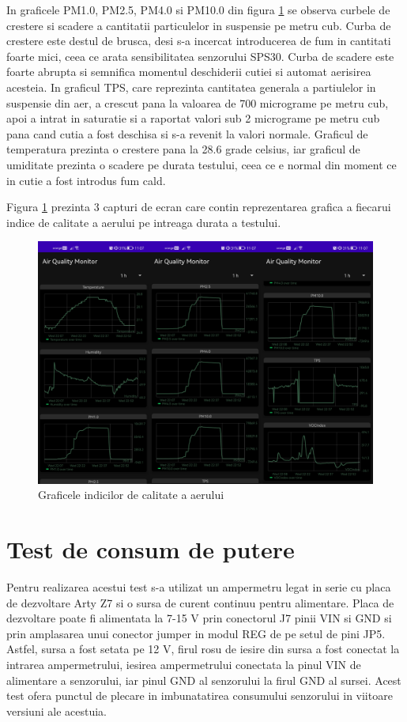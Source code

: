 In graficele PM1.0, PM2.5, PM4.0 si PM10.0 din figura \ref{fig:tv_pm_var_chart_view} se observa curbele de crestere si scadere a cantitatii particulelor in suspensie 
pe metru cub. Curba de crestere este destul de brusca, desi s-a incercat introducerea de fum in cantitati foarte mici, ceea ce arata sensibilitatea senzorului SPS30. 
Curba de scadere este foarte abrupta si semnifica momentul deschiderii cutiei si automat aerisirea acesteia. In graficul TPS, care reprezinta cantitatea generala a 
partiulelor in suspensie din aer, a crescut pana la valoarea de 700 micrograme pe metru cub, apoi a intrat in saturatie si a raportat valori sub 2 micrograme pe metru 
cub pana cand cutia a fost deschisa si s-a revenit la valori normale. Graficul de temperatura prezinta o crestere pana la 28.6 grade celsius, iar graficul de umiditate 
prezinta o scadere pe durata testului, ceea ce e normal din moment ce in cutie a fost introdus fum cald.    

Figura \ref{fig:tv_pm_var_chart_view} prezinta 3 capturi de ecran care contin reprezentarea grafica a fiecarui indice de calitate a aerului pe 
intreaga durata a testului.
\begin{figure}[H]
    \centering
    \includegraphics[scale=0.16]{figs/tv_pm_var_chart_view.png}
    \caption{Graficele indicilor de calitate a aerului}
    \label{fig:tv_pm_var_chart_view}
\end{figure}

\section{Test de consum de putere}\label{sec:tv_pwrcons}
Pentru realizarea acestui test s-a utilizat un ampermetru legat in serie cu placa de dezvoltare Arty Z7 si o sursa de curent continuu pentru alimentare. Placa de dezvoltare 
poate fi alimentata la 7-15 V prin conectorul J7 pinii VIN si GND si prin amplasarea unui conector jumper in modul REG de pe setul de pini JP5. Astfel, sursa a fost setata 
pe 12 V, firul rosu de iesire din sursa a fost conectat la intrarea ampermetrului, iesirea ampermetrului conectata la pinul VIN de alimentare a senzorului, iar pinul GND 
al senzorului la firul GND al sursei. Acest test ofera punctul de plecare in imbunatatirea consumului senzorului in viitoare versiuni ale acestuia.

